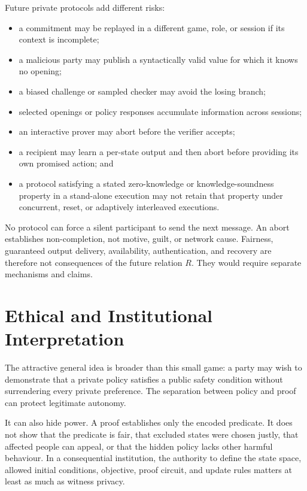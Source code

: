 Future private protocols add different risks:

\begin{itemize}
    \item a commitment may be replayed in a different game, role, or session
    if its context is incomplete;
    \item a malicious party may publish a syntactically valid value for which
    it knows no opening;
    \item a biased challenge or sampled checker may avoid the losing branch;
    \item selected openings or policy responses accumulate information across
    sessions;
    \item an interactive prover may abort before the verifier accepts;
    \item a recipient may learn a per-state output and then abort before
    providing its own promised action; and
    \item a protocol satisfying a stated zero-knowledge or knowledge-soundness
    property in a stand-alone execution may not retain that property under
    concurrent, reset, or adaptively interleaved executions.
\end{itemize}

No protocol can force a silent participant to send the next message. An abort
establishes non-completion, not motive, guilt, or network cause. Fairness,
guaranteed output delivery, availability, authentication, and recovery are
therefore not consequences of the future relation $R$. They would require
separate mechanisms and claims.

\section{Ethical and Institutional Interpretation}
\label{sec:ttt-ethics}

The attractive general idea is broader than this small game: a party may wish
to demonstrate that a private policy satisfies a public safety condition
without surrendering every private preference. The separation between policy
and proof can protect legitimate autonomy.

It can also hide power. A proof establishes only the encoded predicate. It
does not show that the predicate is fair, that excluded states were chosen
justly, that affected people can appeal, or that the hidden policy lacks other
harmful behaviour. In a consequential institution, the authority to define
the state space, allowed initial conditions, objective, proof circuit, and
update rules matters at least as much as witness privacy.

